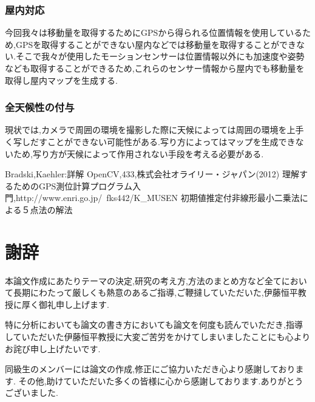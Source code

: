 \documentclass[12pt,oneside]{sotsuken_paper}
\begin{document}
\subsection{屋内対応}
今回我々は移動量を取得するためにGPSから得られる位置情報を使用しているため,GPSを取得することができない屋内などでは移動量を取得することができない.そこで我々が使用したモーションセンサーは位置情報以外にも加速度や姿勢なども取得することができるため,これらのセンサー情報から屋内でも移動量を取得し屋内マップを生成する.

\subsection{全天候性の付与}
現状では,カメラで周囲の環境を撮影した際に天候によっては周囲の環境を上手く写しだすことができない可能性がある.写り方によってはマップを生成できないため,写り方が天候によって作用されない手段を考える必要がある.

\begin{thebibliography}{8}
 Bradski,Kaehler:詳解 OpenCV,433,株式会社オライリー・ジャパン(2012)
 理解するためのGPS測位計算プログラム入門,http://www.enri.go.jp/~fks442/K\_MUSEN
 初期値推定付非線形最小二乗法による５点法の解法
\end{thebibliography}



\chapter*{謝辞}
本論文作成にあたりテーマの決定,研究の考え方,方法のまとめ方など全てにおいて長期にわたって厳しくも熱意のあるご指導,ご鞭撻していただいた,伊藤恒平教授に厚く御礼申し上げます.


特に分析においても論文の書き方においても論文を何度も読んでいただき,指導していただいた伊藤恒平教授に大変ご苦労をかけてしまいましたことにも心よりお詫び申し上げたいです.


同級生のメンバーには論文の作成,修正にご協力いただき心より感謝しております.
その他,助けていただいた多くの皆様に心から感謝しております.ありがとうございました.
%
\end{document}
